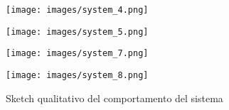 \documentclass{article}
\begin{document}
\begin{figure}[ht]
    \begin{minipage}{0.24\linewidth}
        \centering
        \texttt{[image: images/system\_4.png]}
    \end{minipage}
    \begin{minipage}{0.24\linewidth}
        \centering
        \texttt{[image: images/system\_5.png]}
    \end{minipage}
    \begin{minipage}{0.24\linewidth}
        \centering
        \texttt{[image: images/system\_7.png]}
    \end{minipage}
    \begin{minipage}{0.24\linewidth}
        \centering
        \texttt{[image: images/system\_8.png]}
    \end{minipage}

    \caption{Sketch qualitativo del comportamento del sistema}
    \label{fig:sketch_qualitativo}
\end{figure}
\end{document}
